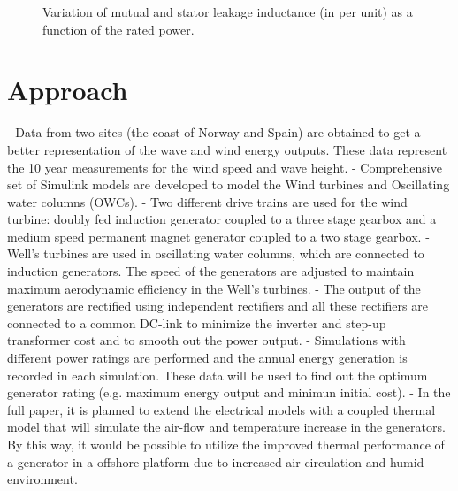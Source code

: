\documentclass[twocolumn]{article}
\begin{document}
\begin{figure}[]
  \centering

    \caption{Variation of mutual and stator leakage inductance (in per unit) as a function of the rated power.} 
    \label{inductance_plots}
\end{figure}


\section{Approach}
- Data from two sites (the coast of Norway and Spain) are obtained to get a better representation of the wave and wind energy outputs. These data represent the 10 year measurements for the wind speed and wave height.
- Comprehensive set of Simulink models are developed to model the Wind turbines and Oscillating water columns (OWCs).
- Two different drive trains are used for the wind turbine: doubly fed induction generator coupled to a three stage gearbox and a medium speed permanent magnet generator coupled to a two stage gearbox.
- Well's turbines are used in oscillating water columns, which are connected to induction generators. The speed of the generators are adjusted to maintain maximum aerodynamic efficiency in the Well's turbines.
- The output of the generators are rectified using independent rectifiers and all these rectifiers are connected to a common DC-link to minimize the inverter and step-up transformer cost and to smooth out the power output.
- Simulations with different power ratings are performed and the annual energy generation is recorded in each simulation. These data will be used to find out the optimum generator rating (e.g. maximum energy output and minimun initial cost).
- In the full paper, it is planned to extend the electrical models with a coupled thermal model that will simulate the air-flow and temperature increase in the generators. By this way, it would be possible to utilize the improved thermal performance of a generator in a offshore platform due to increased air circulation and humid environment.
\end{document}
